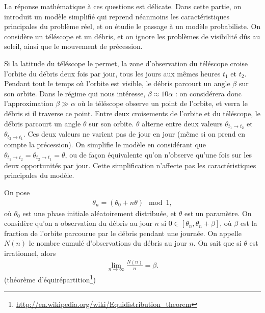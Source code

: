 \documentclass[a4paper,11pt]{article}
\numberwithin{section}{part}
\begin{document}
La réponse mathématique à ces questions est délicate. Dans cette
partie, on introduit un modèle simplifié qui reprend néanmoins les
caractéristiques principales du problème réel, et on étudie le passage
à un modèle probabiliste. On considère un téléscope et un débris, et
on ignore les problèmes de visibilité dûs au soleil, ainsi que le
mouvement de précession.

Si la latitude du téléscope le permet, la zone d'observation du
téléscope croise l'orbite du débris deux fois par jour, tous les jours
aux mêmes heures $t_{1}$ et $t_{2}$. Pendant tout le temps où l'orbite
est visible, le débris parcourt un angle $\beta$ sur son orbite. Dans
le régime qui nous intéresse, $\beta \approx 10 \alpha$ : on
considérera donc l'approximation $\beta \gg \alpha$ où le téléscope
observe un point de l'orbite, et verra le débris si il traverse ce
point. Entre deux croisements de l'orbite et du téléscope, le débris
parcourt un angle $\theta$ sur son orbite. $\theta$ alterne entre deux
valeurs $\theta_{t_{1} \to t_{2}}$ et $\theta_{t_{2} \to t_{1}}$. Ces
deux valeurs ne varient pas de jour en jour (même si on prend en
compte la précession). On simplifie le modèle en considérant que
$\theta_{t_{1} \to t_{2}} = \theta_{t_{2} \to t_{1}} = \theta$, ou de
façon équivalente qu'on n'observe qu'une fois sur les deux
opportunités par jour. Cette simplification n'affecte pas les
caractéristiques principales du modèle.

%   
%   
  

On pose
\begin{align}
  \label{modelejouet}
  \theta_{n} = (\theta_{0} + n \theta) \mod 1,
\end{align}
où $\theta_{0}$ est une phase initiale aléatoirement distribuée, et
$\theta$ est un paramètre. On considère qu'on a observation du débris
au jour $n$ si $0 \in [\theta_{n}, \theta_{n}+\beta]$, où $\beta$ est
la fraction de l'orbite parcourue par le débris pendant une
journée. On appelle $N(n)$ le nombre cumulé d'observations du débris
au jour $n$. On sait que si $\theta$ est irrationnel, alors
\begin{align}
  \label{largenumbers}
  \lim_{n\to\infty} \frac{N(n)} n = \beta.
\end{align}
(théorème d'équirépartition\footnote{\url{http://en.wikipedia.org/wiki/Equidistribution_theorem}})
\end{document}
